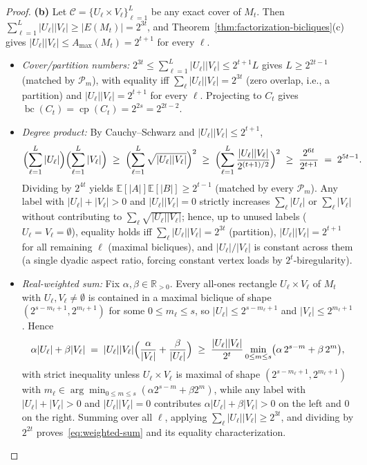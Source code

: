 \documentclass[11pt,reqno]{amsart}
\theoremstyle{definition}
\theoremstyle{remark}
\DeclareMathOperator{\bc}{bc}
\DeclareMathOperator{\cp}{cp}
\newcommand{\RR}{\mathbb{R}}
\newcommand{\EE}{\mathbb{E}}
\numberwithin{equation}{section}
\begin{document}
\begin{proof}
\medskip
\noindent\textbf{(b)} Let $\mathcal{C} = \{U_\ell \times V_\ell\}_{\ell=1}^L$ be any exact cover of $M_t$. Then $\sum_{\ell=1}^L |U_\ell||V_\ell| \ge |E(M_t)| = 2^{3t}$, and Theorem~\ref{thm:factorization-bicliques}(c) gives $|U_\ell||V_\ell| \le A_{\max}(M_t) = 2^{t+1}$ for every $\ell$.
\begin{itemize}[leftmargin=2em]
  \item \emph{Cover/partition numbers:} $2^{3t} \le \sum_{\ell=1}^L |U_\ell||V_\ell| \le 2^{t+1} L$ gives $L \ge 2^{2t-1}$ (matched by $\mathcal{P}_m$), with equality iff $\sum_\ell |U_\ell||V_\ell| = 2^{3t}$ (zero overlap, i.e., a partition) and $|U_\ell||V_\ell| = 2^{t+1}$ for every $\ell$. Projecting to $C_t$ gives $\bc(C_t) = \cp(C_t) = 2^{2s} = 2^{2t-2}$.
  \item \emph{Degree product:} By Cauchy--Schwarz and $|U_\ell||V_\ell| \le 2^{t+1}$,
  \[
    \Bigl(\sum_{\ell=1}^L |U_\ell|\Bigr)\Bigl(\sum_{\ell=1}^L |V_\ell|\Bigr)
    \;\ge\; \Bigl(\sum_{\ell=1}^L \sqrt{|U_\ell||V_\ell|}\Bigr)^2
    \;\ge\; \Bigl(\sum_{\ell=1}^L \frac{|U_\ell||V_\ell|}{2^{(t+1)/2}}\Bigr)^2
    \;\ge\; \frac{2^{6t}}{2^{t+1}} \;=\; 2^{5t-1}.
  \]
  Dividing by $2^{4t}$ yields $\EE[|A|]\EE[|B|] \ge 2^{t-1}$ (matched by every $\mathcal{P}_m$). Any label with $|U_\ell| + |V_\ell| > 0$ and $|U_\ell||V_\ell| = 0$ strictly increases $\sum_\ell |U_\ell|$ or $\sum_\ell |V_\ell|$ without contributing to $\sum_\ell \sqrt{|U_\ell||V_\ell|}$; hence, up to unused labels ($U_\ell = V_\ell = \emptyset$), equality holds iff $\sum_\ell |U_\ell||V_\ell| = 2^{3t}$ (partition), $|U_\ell||V_\ell| = 2^{t+1}$ for all remaining $\ell$ (maximal bicliques), and $|U_\ell|/|V_\ell|$ is constant across them (a single dyadic aspect ratio, forcing constant vertex loads by $2^t$-biregularity).
  \item \emph{Real-weighted sum:} Fix $\alpha, \beta \in \RR_{>0}$. Every all-ones rectangle $U_\ell \times V_\ell$ of $M_t$ with $U_\ell, V_\ell \neq \emptyset$ is contained in a maximal biclique of shape $(2^{s-m_\ell+1}, 2^{m_\ell+1})$ for some $0 \le m_\ell \le s$, so $|U_\ell| \le 2^{s-m_\ell+1}$ and $|V_\ell| \le 2^{m_\ell+1}$. Hence
  \[
    \alpha|U_\ell| + \beta|V_\ell| \;=\; |U_\ell||V_\ell|\Bigl(\frac{\alpha}{|V_\ell|} + \frac{\beta}{|U_\ell|}\Bigr)
    \;\ge\; \frac{|U_\ell||V_\ell|}{2^t}\min_{0 \le m \le s}\bigl(\alpha\,2^{s-m} + \beta\,2^m\bigr),
  \]
  with strict inequality unless $U_\ell \times V_\ell$ is maximal of shape $(2^{s-m_\ell+1}, 2^{m_\ell+1})$ with $m_\ell \in \arg\min_{0 \le m \le s}(\alpha 2^{s-m} + \beta 2^m)$, while any label with $|U_\ell| + |V_\ell| > 0$ and $|U_\ell||V_\ell| = 0$ contributes $\alpha|U_\ell| + \beta|V_\ell| > 0$ on the left and $0$ on the right. Summing over all $\ell$, applying $\sum_\ell |U_\ell||V_\ell| \ge 2^{3t}$, and dividing by $2^{2t}$ proves~\eqref{eq:weighted-sum} and its equality characterization.
\end{itemize}
\end{proof}
\end{document}
